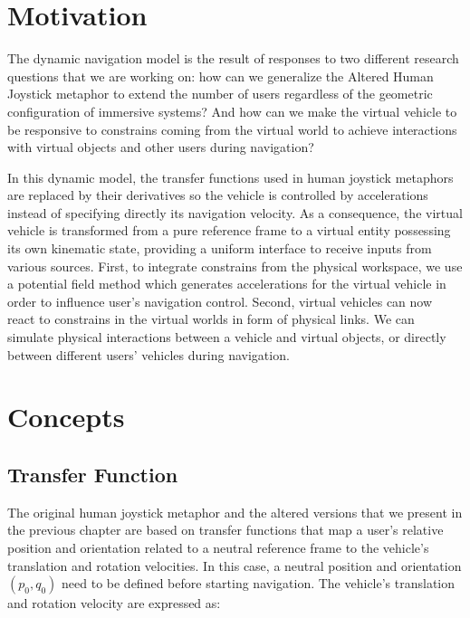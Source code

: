 
\section{Motivation}
The dynamic navigation model is the result of responses to two different research questions that we are working on: how can we generalize the Altered Human Joystick metaphor to extend the number of users regardless of the geometric configuration of immersive systems? And how can we make the virtual vehicle to be responsive to constrains coming from the virtual world to achieve interactions with virtual objects and other users during navigation?

In this dynamic model, the transfer functions used in human joystick metaphors are replaced by their derivatives so the vehicle is controlled by accelerations instead of specifying directly its navigation velocity. As a consequence, the virtual vehicle is transformed from a pure reference frame to a virtual entity possessing its own kinematic state, providing a uniform interface to receive inputs from various sources. First, to integrate constrains from the physical workspace, we use a potential field method which generates accelerations for the virtual vehicle in order to influence user's navigation control. Second, virtual vehicles can now react to constrains in the virtual worlds in form of physical links. We can simulate physical interactions between a vehicle and virtual objects, or directly between different users' vehicles during navigation. 




\section{Concepts}

\subsection{Transfer Function}
The original human joystick metaphor and the altered versions that we present in the previous chapter are based on transfer functions that map a user's relative position and orientation related to a neutral reference frame to the vehicle's translation and rotation velocities. In this case, a neutral position and orientation $(p_{0},q_{0})$ need to be defined before starting navigation. The vehicle's translation and rotation velocity are expressed as:

